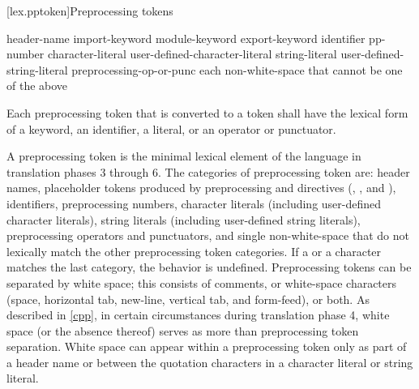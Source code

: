 \documentclass{wg21}
\begin{document}
[lex.pptoken]{Preprocessing tokens}

%
\begin{bnf}
    \br
    header-name\br
    import-keyword\br
    module-keyword\br
    export-keyword\br
    identifier\br
    pp-number\br
    character-literal\br
    user-defined-character-literal\br
    string-literal\br
    user-defined-string-literal\br
    preprocessing-op-or-punc\br
    \br
    \textnormal{each non-white-space  that cannot be one of the above}
\end{bnf}

\pnum
Each preprocessing token that is converted to a token
shall have the lexical form of a keyword, an identifier, a literal,
or an operator or punctuator.

\pnum
A preprocessing token is the minimal lexical element of the language in translation
phases 3 through 6. The categories of preprocessing token are: header names,
placeholder tokens produced by preprocessing  and  directives
(, , and ),
identifiers, preprocessing numbers, character literals (including user-defined character
literals), string literals (including user-defined string literals), preprocessing
operators and punctuators, and single non-white-space  that do not lexically
match the other preprocessing token categories. If a  or a  character
matches the last category, the behavior is undefined. Preprocessing tokens can be
separated by
%
white space;
%
this consists of comments, or white-space
characters (space, horizontal tab, new-line, vertical tab, and
form-feed), or both. As described in \ref{cpp}, in certain
circumstances during translation phase 4, white space (or the absence
thereof) serves as more than preprocessing token separation. White space
can appear within a preprocessing token only as part of a header name or
between the quotation characters in a character literal or
string literal.
\end{document}
